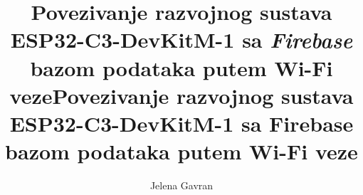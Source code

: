 \documentclass[times, utf8, seminar, numeric]{fer}
\begin{document}
\title{Povezivanje razvojnog sustava ESP32-C3-DevKitM-1 sa \textit{Firebase} bazom podataka putem Wi-Fi veze}

\author{Jelena Gavran}


\maketitle

\tableofcontents

\begingroup
\renewcommand*\listfigurename{Popis slika}
\listoffigures
\endgroup











\title{Povezivanje razvojnog sustava ESP32-C3-DevKitM-1 sa Firebase bazom podataka putem Wi-Fi veze}
\begin{sazetak}
	
\end{sazetak}
\end{document}
